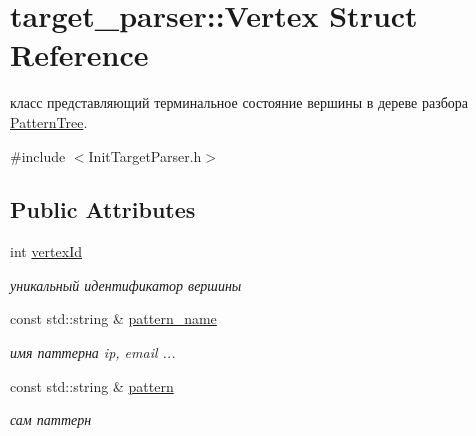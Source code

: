 \hypertarget{structtarget__parser_1_1Vertex}{}\section{target\+\_\+parser\+:\+:Vertex Struct Reference}
\label{structtarget__parser_1_1Vertex}


класс представляющий терминальное состояние вершины в дереве разбора \hyperlink{classtarget__parser_1_1PatternTree}{Pattern\+Tree}.  




{\ttfamily \#include $<$Init\+Target\+Parser.\+h$>$}

\subsection*{Public Attributes}
\begin{DoxyCompactItemize}
\item 
int \hyperlink{structtarget__parser_1_1Vertex_a314e9edd83acba4cd05bbc9c528d2d16}{vertex\+Id}\hypertarget{structtarget__parser_1_1Vertex_a314e9edd83acba4cd05bbc9c528d2d16}{}\label{structtarget__parser_1_1Vertex_a314e9edd83acba4cd05bbc9c528d2d16}

\begin{DoxyCompactList}\small\item\em уникальный идентификатор вершины \end{DoxyCompactList}\item 
const std\+::string \& \hyperlink{structtarget__parser_1_1Vertex_ae42000f37242f120acfa97bfd4331577}{pattern\+\_\+name}\hypertarget{structtarget__parser_1_1Vertex_ae42000f37242f120acfa97bfd4331577}{}\label{structtarget__parser_1_1Vertex_ae42000f37242f120acfa97bfd4331577}

\begin{DoxyCompactList}\small\item\em имя паттерна ip, email ... \end{DoxyCompactList}\item 
const std\+::string \& \hyperlink{structtarget__parser_1_1Vertex_ae56e40ccbab727eae454847485e78296}{pattern}\hypertarget{structtarget__parser_1_1Vertex_ae56e40ccbab727eae454847485e78296}{}\label{structtarget__parser_1_1Vertex_ae56e40ccbab727eae454847485e78296}

\begin{DoxyCompactList}\small\item\em сам паттерн \end{DoxyCompactList}\end{DoxyCompactItemize}
